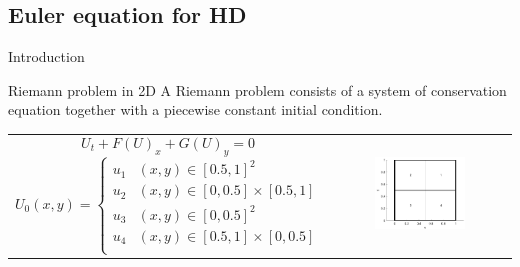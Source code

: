 \subsection{Euler equation for HD}
\begin{frame}{Introduction}
\begin{block}{Riemann problem in 2D}
	A Riemann problem consists of a system of conservation equation together with a piecewise constant initial condition.
\begin{tabular}{l l}
	\begin{minipage}{0.61\textwidth}
				\begin{equation*}
						U_t + F(U)_x + G(U)_y = 0
					\end{equation*}
					\begin{equation*}
						U_0(x,y) = 
						\begin{cases} u_1 & (x,y)  \in [0.5,1]^2 \\ 
						u_2 & (x,y)  \in [0,0.5]\times[0.5,1] \\ 
						u_3 & (x,y)  \in [0,0.5]^2 \\ 
						u_4 & (x,y)  \in [0.5,1]\times[0,0.5] \\ 
						\end{cases}
					\end{equation*}
	\end{minipage}
	&
	\begin{minipage}{0.4\textwidth}
	\hspace{10mm}
		\begin{figure}
			\centering
			\includegraphics[width=\textwidth]{../src2/figs/init.pdf}
		\end{figure}
	\end{minipage}
	\end{tabular}
	\end{block}
\end{frame}

